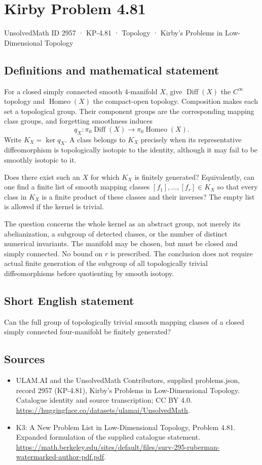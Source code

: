 \documentclass[11pt,a4paper]{article}
\begin{document}
\section*{Kirby Problem 4.81}\label{2957}
{\small UnsolvedMath ID 2957 · KP-4.81 · Topology · Kirby's Problems in Low-Dimensional Topology}
\subsection{Definitions and mathematical statement}
For a closed simply connected smooth $4$-manifold $X$, give
$\operatorname{Diff}(X)$ the $C^\infty$ topology and
$\operatorname{Homeo}(X)$ the compact-open topology. Composition
makes each set a topological group. Their component groups are
the corresponding mapping class groups, and forgetting smoothness
induces
\[
 q_X:\pi_0\operatorname{Diff}(X)\longrightarrow
                         \pi_0\operatorname{Homeo}(X).
\]
Write $K_X=\ker q_X$. A class belongs to $K_X$ precisely when
its representative diffeomorphism is topologically isotopic to the
identity, although it may fail to be smoothly isotopic to it.

Does there exist such an $X$ for which $K_X$ is finitely generated?
Equivalently, can one find a finite list of smooth mapping classes
$[f_1],\ldots,[f_r]\in K_X$ so that every class in $K_X$ is a
finite product of these classes and their inverses? The empty list
is allowed if the kernel is trivial.

The question concerns the whole kernel as an abstract group,
not merely its abelianization, a subgroup of detected classes, or
the number of distinct numerical invariants. The manifold may be
chosen, but must be closed and simply connected. No bound on
$r$ is prescribed. The conclusion does not require actual finite
generation of the subgroup of all topologically trivial diffeomorphisms
before quotienting by smooth isotopy.
\subsection{Short English statement}
Can the full group of topologically trivial smooth mapping classes of a closed simply connected four-manifold be finitely generated?
\subsection{Sources}
\begin{itemize}
\item[S1] ULAM.AI and the UnsolvedMath Contributors, supplied problems.json, record 2957 (KP-4.81), Kirby's Problems in Low-Dimensional Topology. Catalogue identity and source transcription; CC BY 4.0.
\url{https://huggingface.co/datasets/ulamai/UnsolvedMath}.
\item[S2] K3: A New Problem List in Low-Dimensional Topology, Problem 4.81. Expanded formulation of the supplied catalogue statement.
\url{https://math.berkeley.edu/sites/default/files/surv-295-ruberman-watermarked-author-pdf.pdf}.
\end{itemize}
\end{document}
